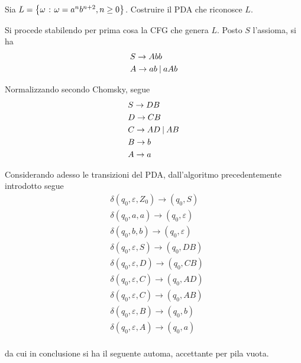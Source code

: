 \documentclass{subfiles}
\begin{document}
\begin{Exercise*}
    Sia \(L = \left\{\omega \operatorname{\: {:} \:} \omega = a^{n}b^{n + 2}, n \ge 0\right\}\). Costruire il PDA che riconosce \(L\).
    \begin{Solution*}
        Si procede stabilendo per prima cosa la CFG che genera \(L\). Posto \(S\) l'assioma, si ha
        \[\begin{aligned}
                 & S \to Abb           \\
                 & A \to ab \:{|}\: aAb \\
            \end{aligned}\]

        \noindent Normalizzando secondo Chomsky, segue
        \[\begin{aligned}
                 & S \to DB           \\
                 & D \to CB           \\
                 & C \to AD \:{|}\: AB \\
                 & B \to b            \\
                 & A \to a            \\
            \end{aligned}\]

        \noindent Considerando adesso le transizioni del PDA, dall'algoritmo precedentemente introdotto segue
        \[\begin{aligned}
                 & \delta(q_{0}, \varepsilon, Z_{0}) \to (q_{0}, S) \\
                 & \delta(q_{0}, a, a) \to (q_{0}, \varepsilon)     \\
                 & \delta(q_{0}, b, b) \to (q_{0}, \varepsilon)     \\
                 & \delta(q_{0}, \varepsilon, S) \to (q_{0}, DB)    \\
                 & \delta(q_{0}, \varepsilon, D) \to (q_{0}, CB)    \\
                 & \delta(q_{0}, \varepsilon, C) \to (q_{0}, AD)    \\
                 & \delta(q_{0}, \varepsilon, C) \to (q_{0}, AB)    \\
                 & \delta(q_{0}, \varepsilon, B) \to (q_{0}, b)     \\
                 & \delta(q_{0}, \varepsilon, A ) \to (q_{0}, a)    \\
            \end{aligned}\]

        \noindent da cui in conclusione si ha il seguente automa, accettante per pila vuota.
        
    \end{Solution*}
\end{Exercise*}

\clearpage
\end{document}
